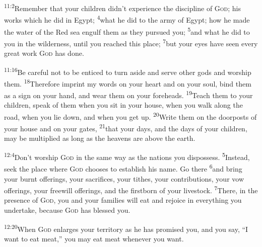 \documentclass[openany,12pt,english]{book}
\newenvironment{para}{\par\pretolerance=100\tolerance=200\setlength{\emergencystretch}{0.6em}\relax}{\par}
\begin{document}
\begin{para}
    \textsuperscript{11:2}\thinspace{}Re\-mem\-ber that your chil\-dren did\-n't ex\-pe\-ri\-ence the dis\-ci\-pline of \textsc{God}; his works which he did in Egypt;
    \textsuperscript{4}\thinspace{}what he did to the ar\-my of Egypt; how he made the wa\-ter of the Red sea en\-gulf them as they pur\-sued you;
    \textsuperscript{5}\thinspace{}and what he did to you in the wil\-der\-ness, un\-til you reached this place;
    \textsuperscript{7}\thinspace{}but your eyes have seen eve\-ry great work \textsc{God} has done.
\end{para}

\begin{para}
    \textsuperscript{11:16}\thinspace{}Be care\-ful not to be en\-ticed to turn a\-side and serve oth\-er gods and wor\-ship them.
    \textsuperscript{18}\thinspace{}There\-fore im\-print my words on your heart and on your soul, bind them as a sign on your hand, and wear them on your foreheads.
    \textsuperscript{19}\thinspace{}Teach them to your chil\-dren, speak of them when you sit in your house, when you walk a\-long the road, when you lie down, and when you get up.
    \textsuperscript{20}\thinspace{}Write them on the doorposts of your house and on your gates,
    \textsuperscript{21}\thinspace{}that your days, and the days of your chil\-dren, may be mul\-ti\-plied as long as the heavens are a\-bove the earth.
\end{para}

\bigskip{}

\begin{para}
    \textsuperscript{12:4}\thinspace{}Don't wor\-ship \textsc{God} in the same way as the nations you dis\-pos\-sess.
    \textsuperscript{5}\thinspace{}In\-stead, seek the place where \textsc{God} chooses to es\-tab\-lish his name. Go there
    \textsuperscript{6}\thinspace{}and bring your burnt offerings, your sacrifices, your tithes, your contributions, your vow offerings, your free\-will offerings, and the firstborn of your live\-stock.
    \textsuperscript{7}\thinspace{}There, in the pres\-ence of \textsc{God}, you and your families will eat and re\-joice in eve\-ry\-thing you un\-der\-take, be\-cause \textsc{God} has bless\-ed you.
\end{para}

\begin{para}
    \textsuperscript{12:20}\thinspace{}When \textsc{God} enlarges your ter\-ri\-to\-ry as he has prom\-ised you, and you say, “I want to eat meat,” you may eat meat when\-ev\-er you want.
\end{para}
\end{document}
